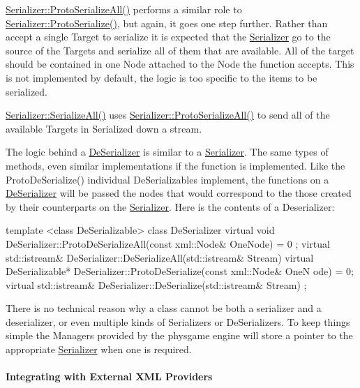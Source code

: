  \par
 \hyperlink{classphys_1_1Serializer_abb5e6f46de9edbf72a7b3e88e955bd69}{Serializer::ProtoSerializeAll()} performs a similar role to \hyperlink{classphys_1_1Serializer_a337a685f966e6d06bfb382905b29db5a}{Serializer::ProtoSerialize()}, but again, it goes one step further. Rather than accept a single Target to serialize it is expected that the \hyperlink{classphys_1_1Serializer}{Serializer} go to the source of the Targets and serialize all of them that are available. All of the target should be contained in one Node attached to the Node the function accepts. This is not implemented by default, the logic is too specific to the items to be serialized. \par
 \par
 \hyperlink{classphys_1_1Serializer_a45fe456179603bb2f19a978d135439a1}{Serializer::SerializeAll()} uses \hyperlink{classphys_1_1Serializer_abb5e6f46de9edbf72a7b3e88e955bd69}{Serializer::ProtoSerializeAll()} to send all of the available Targets in Serialized down a stream. \par
 \par
 The logic behind a \hyperlink{classphys_1_1DeSerializer}{DeSerializer} is similar to a \hyperlink{classphys_1_1Serializer}{Serializer}. The same types of methods, even similar implementations if the function is implemented. Like the ProtoDeSerialize() individual DeSerializables implement, the functions on a \hyperlink{classphys_1_1DeSerializer}{DeSerializer} will be passed the nodes that would correspond to the those created by their counterparts on the \hyperlink{classphys_1_1Serializer}{Serializer}. Here is the contents of a Deserializer: 
\begin{DoxyCode}
 template <class DeSerializable> class DeSerializer
 {
     virtual void DeSerializer::ProtoDeSerializeAll(const xml::Node& OneNode) = 0
      ;
     virtual std::istream& DeSerializer::DeSerializeAll(std::istream& Stream)
     virtual DeSerializable* DeSerializer::ProtoDeSerialize(const xml::Node& OneN
      ode) = 0;
     virtual std::istream& DeSerializer::DeSerialize(std::istream& Stream)
 };
\end{DoxyCode}
 There is no technical reason why a class cannot be both a serializer and a deserializer, or even multiple kinds of Serializers or DeSerializers. To keep things simple the Managers provided by the physgame engine will store a pointer to the appropriate \hyperlink{classphys_1_1Serializer}{Serializer} when one is required. \hypertarget{Serialization_serializationlegacy}{}\paragraph{Integrating with External XML Providers}\label{Serialization_serializationlegacy}
